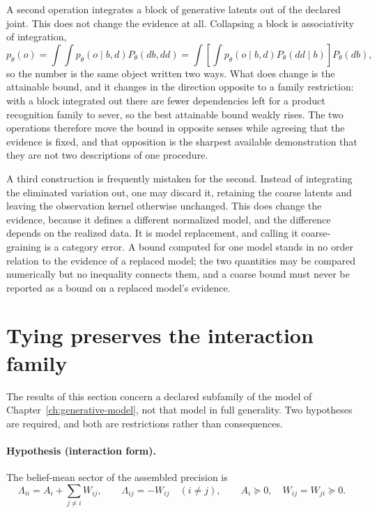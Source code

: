 A second operation integrates a block of generative latents out of the declared joint. This does not change the evidence at all. Collapsing a block is associativity of integration,
\begin{equation}
p_\theta(o)
=\int\!\!\int p_\theta(o\mid b,d)P_\theta(db,dd)
=\int\left[\int p_\theta(o\mid b,d)P_\theta(dd\mid b)\right]P_\theta(db),
\label{eq:coarse-marginalization-identity}
\end{equation}
so the number is the same object written two ways. What does change is the attainable bound, and it changes in the direction opposite to a family restriction: with a block integrated out there are fewer dependencies left for a product recognition family to sever, so the best attainable bound weakly rises. The two operations therefore move the bound in opposite senses while agreeing that the evidence is fixed, and that opposition is the sharpest available demonstration that they are not two descriptions of one procedure.

A third construction is frequently mistaken for the second. Instead of integrating the eliminated variation out, one may discard it, retaining the coarse latents and leaving the observation kernel otherwise unchanged. This does change the evidence, because it defines a different normalized model, and the difference depends on the realized data. It is model replacement, and calling it coarse-graining is a category error. A bound computed for one model stands in no order relation to the evidence of a replaced model; the two quantities may be compared numerically but no inequality connects them, and a coarse bound must never be reported as a bound on a replaced model's evidence.

\section{Tying preserves the interaction family}

The results of this section concern a declared subfamily of the model of Chapter~\ref{ch:generative-model}, not that model in full generality. Two hypotheses are required, and both are restrictions rather than consequences.

\paragraph{Hypothesis (interaction form).}
The belief-mean sector of the assembled precision is
\begin{equation}
\Lambda_{ii}=A_i+\sum_{j\neq i}W_{ij},
\qquad
\Lambda_{ij}=-W_{ij}
\quad(i\neq j),
\qquad
A_i\succeq 0,
\quad
W_{ij}=W_{ji}\succeq 0.
\label{eq:interaction-family-hypothesis}
\end{equation}

